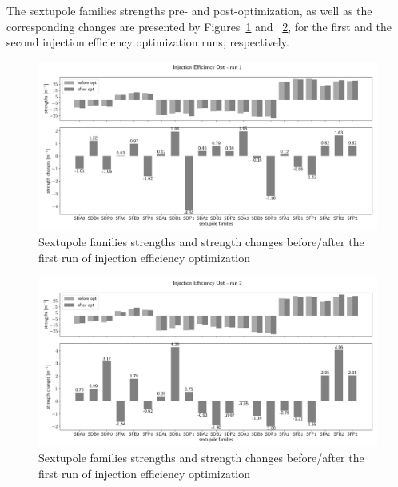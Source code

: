 \documentclass[a4paper,11pt]{article}
\begin{document}
The sextupole families strengths pre- and post-optimization, as well as the corresponding changes are presented by Figures~\ref{inject_sexts1} and ~\ref{inject_sexts2}, for the first and the second injection efficiency optimization runs, respectively.
\begin{figure}[h]
    \centering
    \includegraphics*[width=1\textwidth]{sexts_injeff_run1.png}
    \caption{Sextupole families strengths and strength changes before/after the first run of injection efficiency optimization}
    \label{inject_sexts1}
\end{figure}
\begin{figure}[h]
    \centering
    \includegraphics*[width=\textwidth]{sexts_injeff_run2.png}
    \caption{Sextupole families strengths and strength changes before/after the first run of injection efficiency optimization}
    \label{inject_sexts2}
\end{figure}
\end{document}
